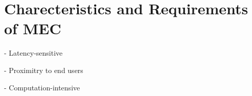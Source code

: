 \section{Charecteristics and Requirements of MEC}  \label{requirements}

- Latency-sensitive

- Proximitry to end users

- Computation-intensive
